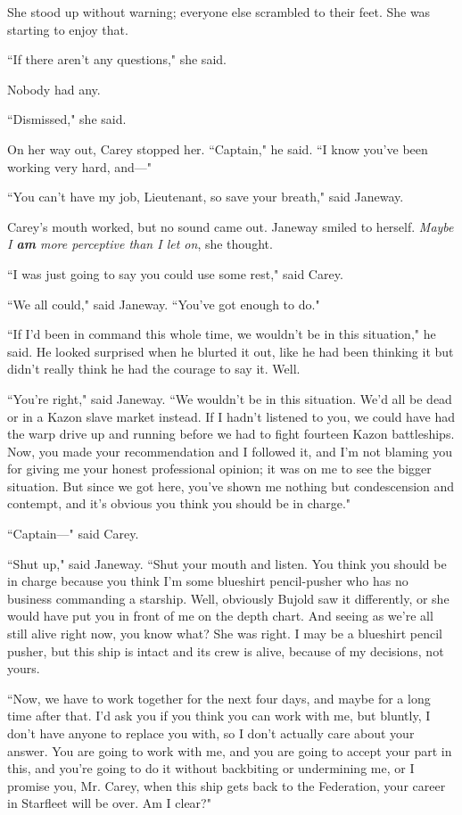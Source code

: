 \documentclass[twoside,letterpaper,12pt]{memoir}
\begin{document}
She stood up without warning; everyone else scrambled to their feet. She was starting to enjoy that. 

``If there aren't any questions," she said. 

Nobody had any. 

``Dismissed," she said. 

On her way out, Carey stopped her. ``Captain," he said. ``I know you've been working very hard, and---" 

``You can't have my job, Lieutenant, so save your breath," said Janeway. 

Carey's mouth worked, but no sound came out. Janeway smiled to herself. \textit{Maybe I \textbf{am} more perceptive than I let on}, she thought. 

``I was just going to say you could use some rest," said Carey. 

``We all could," said Janeway. ``You've got enough to do." 

``If I'd been in command this whole time, we wouldn't be in this situation," he said. He looked surprised when he blurted it out, like he had been thinking it but didn't really think he had the courage to say it. Well. 

``You're right," said Janeway. ``We wouldn't be in this situation. We'd all be dead or in a Kazon slave market instead. If I hadn't listened to you, we could have had the warp drive up and running before we had to fight fourteen Kazon battleships. Now, you made your recommendation and I followed it, and I'm not blaming you for giving me your honest professional opinion; it was on me to see the bigger situation. But since we got here, you've shown me nothing but condescension and contempt, and it's obvious you think you should be in charge." 

``Captain---" said Carey. 

``Shut up," said Janeway. ``Shut your mouth and listen. You think you should be in charge because you think I'm some blueshirt pencil-pusher who has no business commanding a starship. Well, obviously Bujold saw it differently, or she would have put you in front of me on the depth chart. And seeing as we're all still alive right now, you know what? She was right. I may be a blueshirt pencil pusher, but this ship is intact and its crew is alive, because of my decisions, not yours. 

``Now, we have to work together for the next four days, and maybe for a long time after that. I'd ask you if you think you can work with me, but bluntly, I don't have anyone to replace you with, so I don't actually care about your answer. You are going to work with me, and you are going to accept your part in this, and you're going to do it without backbiting or undermining me, or I promise you, Mr. Carey, when this ship gets back to the Federation, your career in Starfleet will be over. Am I clear?" 
\end{document}
